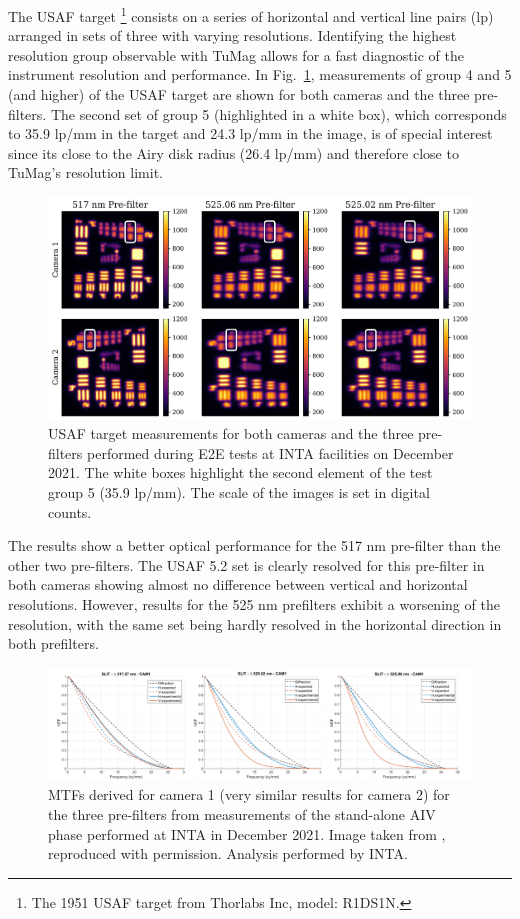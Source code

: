 The USAF target \footnote{The 1951 USAF target from Thorlabs Inc, model: R1DS1N.} consists on a series of horizontal and vertical line pairs (lp) arranged in sets of three with varying resolutions. Identifying the highest resolution group observable with TuMag allows for a fast diagnostic of the instrument resolution and performance. In Fig.~\ref{tumag : USAF}, measurements of group 4 and 5 (and higher) of the USAF target are shown for both cameras and the three pre-filters. The second set of group 5 (highlighted in a white box), which corresponds to 35.9 lp/mm in the target and 24.3 lp/mm in the image, is of special interest since its close to the Airy disk radius (26.4 lp/mm) and therefore close to TuMag's resolution limit. 

\begin{figure}[t]
    \includegraphics[width=\textwidth]{figures/TuMag/USAF_E2E.pdf}
    \caption[Optical E2E USAF measurements.]{
      USAF target measurements for both cameras and the three pre-filters performed during E2E tests at INTA facilities on December 2021. The white boxes highlight the second element of the test group 5 (35.9 lp/mm). The scale of the images is set in digital counts.}
      \label{tumag : USAF}
\end{figure}

The results show a better optical performance for the 517 nm pre-filter than the other two pre-filters. The USAF 5.2 set is clearly resolved for this pre-filter in both cameras showing almost no difference between vertical and horizontal resolutions. However, results for the 525 nm prefilters exhibit a worsening of the resolution, with the same set being hardly resolved in the horizontal direction in both prefilters. 

\begin{figure}[t]
    \includegraphics[width=\textwidth]{figures/TuMag/mtfs.pdf}
    \caption[TuMag's MTFs.]{MTFs derived for camera 1 (very similar results for camera 2) for the three pre-filters from measurements of the stand-alone AIV phase performed at INTA in December 2021. Image taken from \citep{tumag}, reproduced with permission. Analysis performed by INTA. 
      \label{fig_tumag:mtfs}}
\end{figure}


